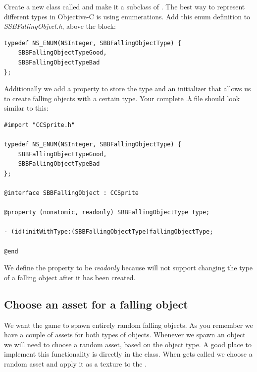 Create a new class called  and make it a subclass
of \ccsprite{}. The best way to represent different types in Objective-C is
using enumerations. Add this enum definition to \textit{SSBFallingObject.h},
above the  block:

\begin{lstlisting}
typedef NS_ENUM(NSInteger, SBBFallingObjectType) {
    SBBFallingObjectTypeGood,
    SBBFallingObjectTypeBad
};
\end{lstlisting}

Additionally we add a property to store the type and an initializer that allows
us to create falling objects with a certain type. Your complete \textit{.h} file
should look similar to this:

\begin{lstlisting}
#import "CCSprite.h"

typedef NS_ENUM(NSInteger, SBBFallingObjectType) {
    SBBFallingObjectTypeGood,
    SBBFallingObjectTypeBad
};

@interface SBBFallingObject : CCSprite

@property (nonatomic, readonly) SBBFallingObjectType type;

- (id)initWithType:(SBBFallingObjectType)fallingObjectType;

@end
\end{lstlisting}

We define the property to be \textit{readonly} because will not support changing
the type of a falling object after it has been created.

\subsection{Choose an asset for a falling object}
We want the game to spawn entirely random falling objects. As you remember we
have a couple of assets for both types of objects. Whenever we spawn an object
we will need to choose a random asset, based on the object type. A good place to
implement this functionality is directly in the 
class. When  gets called we choose a random asset and
apply it as a texture to the .

